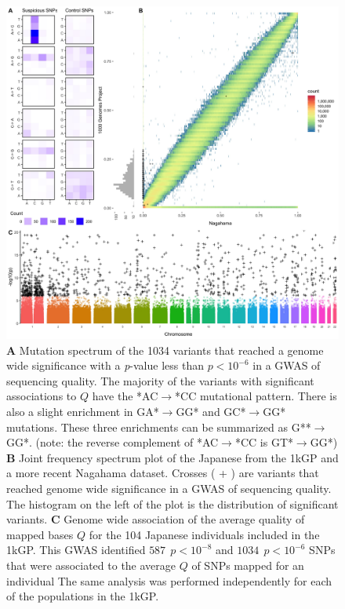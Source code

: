 \documentclass[
11pt, %
oneside, %
english, %
doublespacing, %
headsepline, %
chapterinoneline, %
]{MastersDoctoralThesis} %
\begin{document}
\begin{figure}
\includegraphics[width=\hsize,keepaspectratio]{./Figures/Figure1.jpg}
\caption{
\textbf{A} 
Mutation spectrum of the 1034 variants that reached a genome wide significance with a \textit{p}-value less than $p < 10^{-6}$  in a GWAS of sequencing quality. 
The majority of the variants with significant associations to $Q$ have the *AC${\rightarrow}$*CC mutational pattern. There is also a slight enrichment in GA*${\rightarrow}$GG* and GC*${\rightarrow}$GG* mutations. These three enrichments can be summarized as G**${\rightarrow}$GG*. (note: the reverse complement of *AC${\rightarrow}$*CC is GT*${\rightarrow}$GG*)
\textbf{B} 
Joint frequency spectrum plot of the Japanese from the 1kGP and a more recent Nagahama dataset.
Crosses ( + ) are variants that reached genome wide significance in a GWAS of sequencing quality. 
The histogram on the left of the plot is the distribution of significant variants. 
\textbf{C} 
Genome wide association of the average quality of mapped bases $Q$ for the 104 Japanese individuals included in the 1kGP. This GWAS identified $587\ \  p < 10^{-8}$ and $1034\ \ p < 10^{-6}$ SNPs that were associated to the average $Q$ of SNPs mapped for an individual
The same analysis was performed independently for each of the populations in the 1kGP. }
 \label{SFS}
\end{figure}
\end{document}
